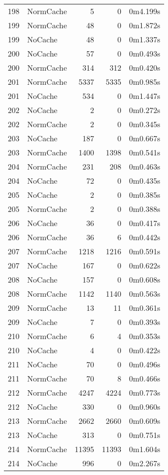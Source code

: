 \begin{tabular}{llrrl}
198 & NormCache & 5 & 0 & 0m4.199s \\
199 & NormCache & 48 & 0 & 0m1.872s \\
199 & NoCache & 48 & 0 & 0m1.337s \\
200 & NoCache & 57 & 0 & 0m0.493s \\
200 & NormCache & 314 & 312 & 0m0.420s \\
201 & NormCache & 5337 & 5335 & 0m0.985s \\
201 & NoCache & 534 & 0 & 0m1.447s \\
202 & NoCache & 2 & 0 & 0m0.272s \\
202 & NormCache & 2 & 0 & 0m0.345s \\
203 & NoCache & 187 & 0 & 0m0.667s \\
203 & NormCache & 1400 & 1398 & 0m0.541s \\
204 & NormCache & 231 & 208 & 0m0.463s \\
204 & NoCache & 72 & 0 & 0m0.435s \\
205 & NoCache & 2 & 0 & 0m0.385s \\
205 & NormCache & 2 & 0 & 0m0.388s \\
206 & NoCache & 36 & 0 & 0m0.417s \\
206 & NormCache & 36 & 6 & 0m0.442s \\
207 & NormCache & 1218 & 1216 & 0m0.591s \\
207 & NoCache & 167 & 0 & 0m0.622s \\
208 & NoCache & 157 & 0 & 0m0.608s \\
208 & NormCache & 1142 & 1140 & 0m0.563s \\
209 & NormCache & 13 & 11 & 0m0.361s \\
209 & NoCache & 7 & 0 & 0m0.393s \\
210 & NormCache & 6 & 4 & 0m0.353s \\
210 & NoCache & 4 & 0 & 0m0.422s \\
211 & NoCache & 70 & 0 & 0m0.496s \\
211 & NormCache & 70 & 8 & 0m0.466s \\
212 & NormCache & 4247 & 4224 & 0m0.773s \\
212 & NoCache & 330 & 0 & 0m0.960s \\
213 & NormCache & 2662 & 2660 & 0m0.609s \\
213 & NoCache & 313 & 0 & 0m0.751s \\
214 & NormCache & 11395 & 11393 & 0m1.604s \\
214 & NoCache & 996 & 0 & 0m2.267s \\

\end{tabular}
